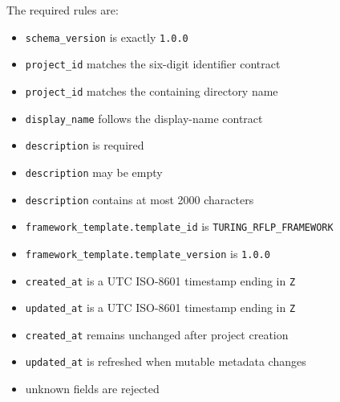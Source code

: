 \begin{Shaded}
\begin{Highlighting}[]
\FunctionTok{\{}
  \FunctionTok{:} \FunctionTok{,}
  \FunctionTok{:} \FunctionTok{,}
  \FunctionTok{:} \FunctionTok{,}
  \FunctionTok{:} \FunctionTok{,}
  \FunctionTok{:} \FunctionTok{\{}
    \FunctionTok{:} \FunctionTok{,}
    \FunctionTok{:} 
  \FunctionTok{\},}
  \FunctionTok{:} \FunctionTok{,}
  \FunctionTok{:} 
\FunctionTok{\}}
\end{Highlighting}
\end{Shaded}

The required rules are:

\begin{itemize}
\tightlist
\item
  \texttt{schema\_version} is exactly \texttt{1.0.0}
\item
  \texttt{project\_id} matches the six-digit identifier contract
\item
  \texttt{project\_id} matches the containing directory name
\item
  \texttt{display\_name} follows the display-name contract
\item
  \texttt{description} is required
\item
  \texttt{description} may be empty
\item
  \texttt{description} contains at most 2000 characters
\item
  \texttt{framework\_template.template\_id} is \texttt{TURING\_RFLP\_FRAMEWORK}
\item
  \texttt{framework\_template.template\_version} is \texttt{1.0.0}
\item
  \texttt{created\_at} is a UTC ISO-8601 timestamp ending in \texttt{Z}
\item
  \texttt{updated\_at} is a UTC ISO-8601 timestamp ending in \texttt{Z}
\item
  \texttt{created\_at} remains unchanged after project creation
\item
  \texttt{updated\_at} is refreshed when mutable metadata changes
\item
  unknown fields are rejected
\end{itemize}

